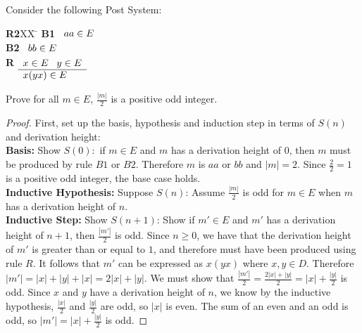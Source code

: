 \documentclass[]{exam}
\theoremstyle{definition}
\begin{document}
\begin{questions}
\question Consider the following Post System:
\begin{tabbing}
{\bf R2}XX \=  \kill
{\bf B1} \>
        \(\begin{array}[t]{l}
        aa \in E
        \end{array}\) \\[2ex]
{\bf B2} \>
        \(\begin{array}[t]{l}
        bb \in E
        \end{array}\) \\[2ex]
{\bf R} \>
        \(\begin{array}[t]{l}
        x \in E \;\;\;y \in E \\
        \hline
        x(yx) \in E
        \end{array}\) 
\end{tabbing}
Prove for all $m \in E$, $\frac{|m|}{2}$ is a positive odd integer.  
\begin{solution}
\begin{proof}
First, set up the basis, hypothesis and induction step in terms of $S(n)$ and
derivation height:
~\\
\textbf{Basis:} Show $S(0):$ if $m \in E$ and $m$ has a derivation height of
$0$, then $m$ must be produced by rule $B1$ or $B2$. Therefore $m$ is $aa$ or $bb$ 
and $|m| = 2$. Since $\frac{2}{2} = 1$ is a positive odd integer, the base
case holds.
~\\
\textbf{Inductive Hypothesis:} Suppose $S(n)$: Assume $\frac{|m|}{2}$ is odd
for $m \in E$ when $m$ has a derivation height of $n$.
~\\
\textbf{Inductive Step:} Show $S(n+1)$: Show if $m' \in E$ and $m'$ has a
derivation height of $n + 1$, then $\frac{|m'|}{2}$ is odd.  Since $n \geq 0$,
we have that the derivation height of $m'$ is greater than or equal to
$1$, and therefore must have been produced using rule $R$. It follows
that $m'$ can be expressed as $x(yx)$ where $x,y \in D$. Therefore $|m'| = |x| +
|y| + |x| = 2|x| + |y|$. We must show that $\frac{|m'|}{2} = \frac{2|x| + |y|}{2} = |x| +
\frac{|y|}{2}$ is odd.  Since $x$ and $y$ have a derivation height of $n$,
we know by the inductive hypothesis, $\frac{|x|}{2}$ 
and $\frac{|y|}{2}$ are odd, so $|x|$ is even. The sum of an even and
an odd is odd, so $|m'| = |x| + \frac{|y|}{2}$ is odd.
\end{proof}
\end{solution}
\end{questions}
\end{document}
